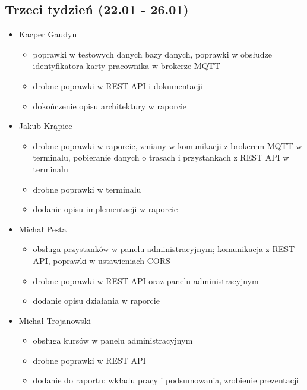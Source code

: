 \subsection{Trzeci tydzień (22.01 - 26.01)}
\begin{itemize}
  \item{
    Kacper Gaudyn
    \begin{itemize}
      \item{poprawki w testowych danych bazy danych, poprawki w obsłudze identyfikatora karty pracownika w brokerze MQTT}
      \item{drobne poprawki w REST API i dokumentacji}
      \item{dokończenie opisu architektury w raporcie}
    \end{itemize}
  }
  \item{
    Jakub Krąpiec
    \begin{itemize}
      \item{drobne poprawki w raporcie, zmiany w komunikacji z brokerem MQTT w terminalu, pobieranie danych o trasach i przystankach z REST API w terminalu}
      \item{drobne poprawki w terminalu}
      \item{dodanie opisu implementacji w raporcie}
    \end{itemize}
  }
  \item{
    Michał Pesta
    \begin{itemize}
      \item{obsługa przystanków w panelu administracyjnym; komunikacja z REST API, poprawki w ustawieniach CORS}
      \item{drobne poprawki w REST API oraz panelu administracyjnym}
      \item{dodanie opisu działania w raporcie}
    \end{itemize}
  }
  \item{
    Michał Trojanowski
    \begin{itemize}
      \item{obsługa kursów w panelu administracyjnym}
      \item{drobne poprawki w REST API}
      \item{dodanie do raportu: wkładu pracy i podsumowania, zrobienie prezentacji}
    \end{itemize}
  }
\end{itemize}
